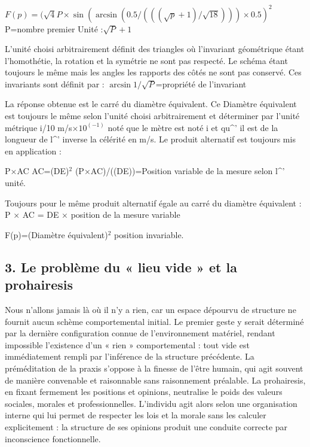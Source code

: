 \documentclass[12pt,letterpaper,oneside]{article}
\begin{document}
$F(p)=(\sqrt{4}P\times\sin(\arcsin(0.5/(((\sqrt{p}+1)/\sqrt{18})) )\times0.5)^2$
P=nombre premier
Unité :$\sqrt{P}+1$

L’unité choisi arbitrairement définit des triangles où l’invariant géométrique étant l’homothétie, la rotation et la symétrie ne sont pas respecté. Le schéma étant toujours le même mais les angles les rapports des côtés ne sont pas conservé. Ces invariants sont définit par :
$\arcsin 1/\sqrt{P}$=propriété de l'invariant

La réponse obtenue est le carré du diamètre équivalent.
Ce Diamètre équivalent est toujours le même selon l’unité choisi arbitrairement et déterminer par l’unité métrique
i/10  m/s×$10^{(-1)}$ noté que le mètre est noté i et qu\textasciicircum{}' il est de la longueur de
l\textasciicircum{}' inverse la célérité en m/s.
Le produit alternatif est toujours mis en application :

P×AC
AC=(DE)$^2$
(P×AC)/((DE))=Position variable de la mesure selon l\textasciicircum{}' unité.

Toujours pour le même produit alternatif égale au carré du diamètre équivalent :
P × AC = DE × position de la mesure variable

F(p)=(Diamètre équivalent)$^2$ position invariable.

\subsection*{3. Le problème du « lieu vide » et la prohairesis}
Nous n’allons jamais là où il n’y a rien, car un espace dépourvu de structure ne fournit aucun schème comportemental initial. Le premier geste y serait déterminé par la dernière configuration connue de l’environnement matériel, rendant impossible l’existence d’un « rien » comportemental : tout vide est immédiatement rempli par l’inférence de la structure précédente.
La préméditation de la praxis s’oppose à la finesse de l’être humain, qui agit souvent de manière convenable et raisonnable sans raisonnement préalable. La prohairesis, en fixant fermement les positions et opinions, neutralise le poids des valeurs sociales, morales et professionnelles. L’individu agit alors selon une organisation interne qui lui permet de respecter les lois et la morale sans les calculer explicitement : la structure de ses opinions produit une conduite correcte par inconscience fonctionnelle.
\end{document}
